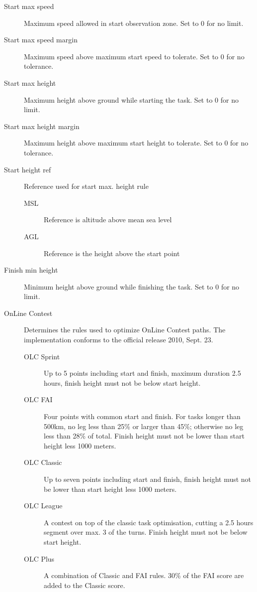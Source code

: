 \begin{description}
\item[Start max speed]  Maximum speed allowed in start observation zone.  Set to 0 for no limit.
\item[Start max speed margin] Maximum speed above maximum start speed to tolerate.  Set to 0 for no tolerance.
\item[Start max height]  Maximum height above ground while starting the task.  Set to 0 for no limit.
\item[Start max height margin]  Maximum height above maximum start height to tolerate.  Set to 0 for no tolerance.
\item[Start height ref]  Reference used for start max. height rule
\begin{description}
\item[MSL] Reference is altitude above mean sea level
\item[AGL] Reference is the height above the start point
\end{description}
\item[Finish min height]  Minimum height above ground while finishing the task.  Set to 0 for no limit. 
\item[OnLine Contest] Determines the rules used to optimize OnLine Contest
paths.  The implementation  conforms to the official release 2010, Sept. 23.
\begin{description}
\item[OLC Sprint]  Up to 5 points including start and finish, maximum duration
2.5 hours, finish height must not be below start height.
\item[OLC FAI]  Four points with common start and finish.  For tasks longer than
500km, no leg less than 25\% or larger than 45\%; otherwise no leg less than 28\% of total.  Finish height must 
not be lower than start height less 1000 meters.
\item[OLC Classic]  Up to seven points including start and finish, finish height
must not be lower than start height less 1000 meters.
\item[OLC League]  A contest on top of the classic task optimisation, cutting
a 2.5 hours segment over max. 3 of the turns. Finish height must not be below
start height.
\item[OLC Plus]  A combination of Classic and FAI rules. 30\% of the FAI score
are added to the Classic score.
\end{description}
\end{description}


